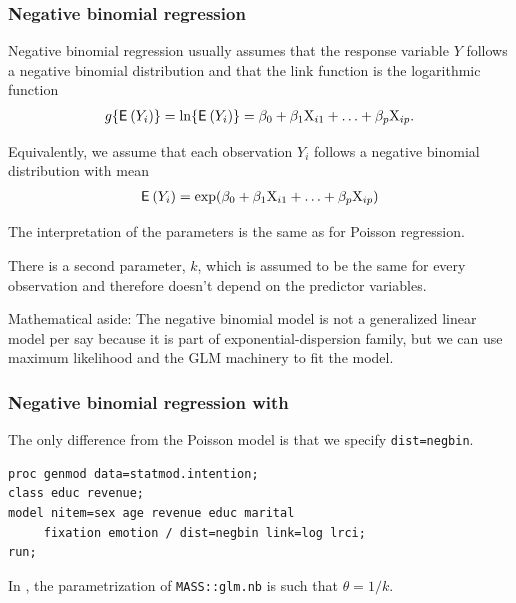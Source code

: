 \documentclass{beamer}
\begin{document}
\begin{frame}[fragile]
\frametitle{Negative binomial regression}
\bi
\item Negative binomial regression usually assumes that the response variable $Y$ 
follows a \alert{negative binomial} distribution and that the \alert{link function} is the logarithmic function 
\begin{align*}
g\{{\mathsf E}_{}\left(Y_i\right)\}=\ln\{{\mathsf E}_{}\left(Y_i\right)\}=\beta_0+\beta_1\mathrm{X}_{i1}+\ldots+\beta_p\mathrm{X}_{ip}.
\end{align*}
\item Equivalently, we assume that each observation $Y_i$ follows a negative binomial distribution with mean
\begin{align*}
{\mathsf E}_{}\left(Y_i\right)=\exp(\beta_0+\beta_1\mathrm{X}_{i1}+\ldots+\beta_p\mathrm{X}_{ip})
\end{align*}
\item The interpretation of the parameters is the same as for Poisson regression. 

\item There is a second parameter, $k$, which is assumed to be \alert{the same for every observation} and therefore doesn't depend on the predictor variables.
\ei

{ \tiny Mathematical aside:
The negative binomial model is not a generalized linear model per say because it is part of exponential-dispersion family, but we can use maximum likelihood and the GLM machinery to fit the model.

}
\end{frame}



\begin{frame}[fragile]
\frametitle{Negative binomial regression with }
The only difference from the Poisson model is that we specify \texttt{dist=negbin}.
\begin{tcolorbox}[colback=white, colframe=hecblue, title=SAS code to fit a negative binomial model]
\begin{verbatim}
proc genmod data=statmod.intention;
class educ revenue;
model nitem=sex age revenue educ marital
     fixation emotion / dist=negbin link=log lrci;
run;
\end{verbatim}
\end{tcolorbox}
{\footnotesize
In \Rlang, the parametrization of \texttt{MASS::glm.nb} is such that $\theta=1/k$.


}
\end{frame}
\end{document}
